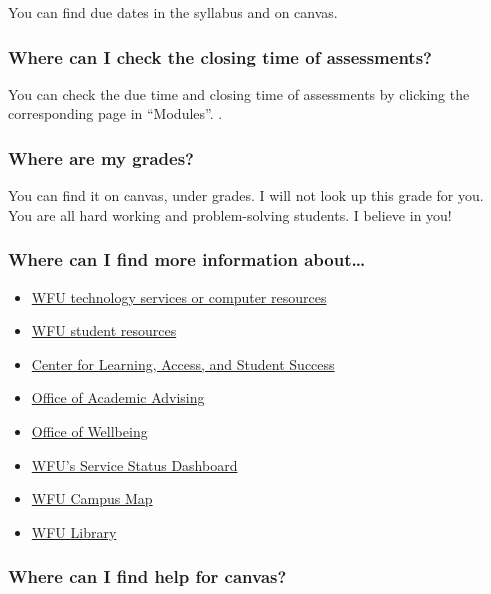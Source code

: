 \documentclass[
]{book}
\providecommand{\tightlist}{%
  \setlength{\itemsep}{0pt}\setlength{\parskip}{0pt}}
\begin{document}
You can find due dates in the syllabus and on canvas.

\hypertarget{where-can-i-check-the-closing-time-of-assessments}{%
\subsubsection{Where can I check the closing time of assessments?}\label{where-can-i-check-the-closing-time-of-assessments}}

You can check the due time and closing time of assessments by clicking the corresponding page in ``Modules''. .

\hypertarget{where-are-my-grades}{%
\subsubsection{Where are my grades?}\label{where-are-my-grades}}

You can find it on canvas, under grades. I will not look up this grade for you. You are all hard working and problem-solving students. I believe in you!

\hypertarget{where-can-i-find-more-information-about}{%
\subsubsection{Where can I find more information about\ldots{}}\label{where-can-i-find-more-information-about}}

\begin{itemize}
\tightlist
\item
  \href{https://is.wfu.edu/student/}{WFU technology services or computer resources}
\item
  \href{https://college.wfu.edu/student-resources/}{WFU student resources}
\item
  \href{https://class.wfu.edu/}{Center for Learning, Access, and Student Success}
\item
  \href{https://advising.wfu.edu/}{Office of Academic Advising}
\item
  \href{https://thrive.wfu.edu/}{Office of Wellbeing}
\item
  \href{https://status.is.wfu.edu/}{WFU's Service Status Dashboard}
\item
  \href{https://map.wfu.edu/}{WFU Campus Map}
\item
  \href{https://zsr.wfu.edu/}{WFU Library}
\end{itemize}

\hypertarget{where-can-i-find-help-for-canvas}{%
\subsubsection{Where can I find help for canvas?}\label{where-can-i-find-help-for-canvas}}
\end{document}
